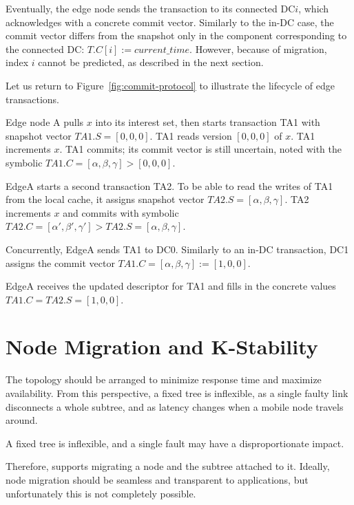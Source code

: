Eventually, the edge node sends the transaction to its connected DC$i$,
which acknowledges with a concrete commit vector.
Similarly to the in-DC case, the commit vector differs from the snapshot
only in the component corresponding to the connected DC: $T.C[i] :=
\mathit{current\_time}$.
However, because of migration, index $i$ cannot be predicted, as
described in the next section.

Let us return to Figure~\ref{fig:commit-protocol} to illustrate
the lifecycle of edge transactions.
\begin{inparaenum}
\item [\refevent{txn:TA1}]
  Edge node A pulls $x$ into its interest set, then starts 
  transaction TA1 with snapshot vector $TA1.S = [0,0,0]$.
  TA1 reads version $[0,0,0]$ of $x$.
  TA1 increments $x$.
  TA1 commits; its commit vector is still uncertain, noted with the
  symbolic $TA1.C = [\alpha, \beta, \gamma] > [0,0,0]$.
\item [\refevent{txn:TA2}]
  EdgeA starts a second transaction TA2.
  To be able to read the writes of TA1 from the local cache, it assigns
  snapshot vector $TA2.S = [\alpha, \beta, \gamma]$.
  TA2 increments $x$ and commits with symbolic $TA2.C = [\alpha',
  \beta', \gamma'] > TA2.S = [\alpha, \beta, \gamma]$.
\item [\refevent{txn:TA1:DC0}]
  Concurrently, EdgeA sends TA1 to DC0.
  Similarly to an in-DC transaction, DC1 assigns the commit vector
  $TA1.C = [\alpha, \beta, \gamma] := [1,0,0]$.
\item [\refevent{txn:TA1:ack}]
  EdgeA receives the updated descriptor for TA1 and fills in the
  concrete values $TA1.C = TA2.S = [1,0,0]$.
\end{inparaenum}

\section{Node Migration and K-Stability}
\label{sec:device-migration}


The topology should be arranged to minimize response time and maximize
availability.
From this perspective, a fixed tree is inflexible, as a
single faulty link disconnects a whole subtree, and as latency changes
when a mobile node travels around.

A fixed tree is inflexible, and a single fault may have a
disproportionate impact.

Therefore, \system{} supports migrating a node and the subtree attached
to it.
Ideally, node migration should be seamless and  transparent to
applications, but unfortunately this is not completely possible.

